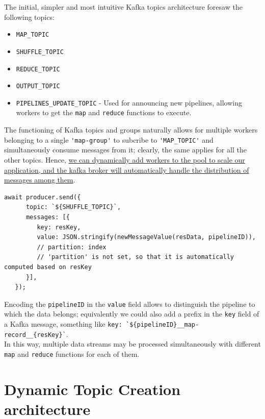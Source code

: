 {The initial, simpler and most intuitive Kafka topics architecture foresaw the following topics:\ns
\begin{itemize}
   \label{enum:simplerTopics}
   \item \lstinline|MAP_TOPIC|
   \item \lstinline|SHUFFLE_TOPIC|
   \item \lstinline|REDUCE_TOPIC|
   \item \lstinline|OUTPUT_TOPIC|
   \item \lstinline|PIPELINES_UPDATE_TOPIC| - Used for announcing new pipelines, allowing workers to get the \lstinline|map| and \lstinline|reduce| functions to execute.
\end{itemize}}

The functioning of Kafka topics and groups naturally allows for multiple workers belonging to a single \lstinline|'map-group'| to subcribe to \lstinline|'MAP_TOPIC'| and simultaneously consume messages from it; clearly, the same applies for all the other topics. 
Hence, \ul{we can dynamically add workers to the pool to scale our application, and the kafka broker will automatically handle the distribution of messages among them}.

\begin{lstlisting}[caption={Sending MAP record to shuffle topic},label={lst:sendingMapRecord}]
   await producer.send({
      topic: `${SHUFFLE_TOPIC}`,
      messages: [{
         key: resKey,
         value: JSON.stringify(newMessageValue(resData, pipelineID)),
         // partition: index
         // 'partition' is not set, so that it is automatically computed based on resKey 
      }],
   });
\end{lstlisting}
Encoding the \lstinline|pipelineID| in the \lstinline|value| field allows to distinguish the pipeline to which the data belongs; equivalently we could also add a prefix in the \texttt{key} field of a Kafka message, something like \lstinline|key: `${pipelineID}__map-record__{resKey}`|.\\
In this way, multiple data streams may be processed simultaneously with different \lstinline|map| and \lstinline|reduce| functions for each of them.


\section{Dynamic Topic Creation architecture}
